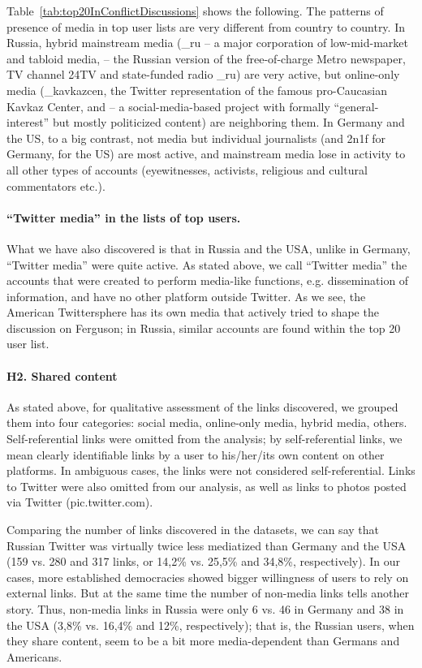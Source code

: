 Table~\cref{tab:top20InConflictDiscussions} shows the following. The patterns of presence of media in top user lists are very different from country to country. In Russia, hybrid mainstream media (\@lifenews\_ru -- a major corporation of low-mid-market and tabloid media, \@MetroRussia -- the Russian version of the free-of-charge Metro newspaper, TV channel \@Mir24TV and state-funded radio \@ruvr\_ru) are very active, but online-only media (\@news\_kavkazcen, the Twitter representation of the famous pro-Caucasian Kavkaz Center, and \@krgzr -- a social-media-based project with formally “general-interest” but mostly politicized content) are neighboring them. In Germany and the US, to a big contrast, not media but individual journalists (\@MattiasMeisner and \@2n1f for Germany, \@CaccioppoliMike for the US) are most active, and mainstream media lose in activity to all other types of accounts (eyewitnesses, activists, religious and cultural commentators etc.).

\paragraph{“Twitter media” in the lists of top users.} What we have also discovered is that in Russia and the USA, unlike in Germany, “Twitter media” were quite active. As stated above, we call “Twitter media” the accounts that were created to perform media-like functions, e.g. dissemination of information, and have no other platform outside Twitter. As we see, the American Twittersphere has its own media that actively tried to shape the discussion on Ferguson; in Russia, similar accounts are found within the top 20 user list.

\paragraph{H2. Shared content}
As stated above, for qualitative assessment of the links discovered, we grouped them into four categories: social media, online-only media, hybrid media, others. Self-referential links were omitted from the analysis; by self-referential links, we mean clearly identifiable links by a user to his/her/its own content on other platforms. In ambiguous cases, the links were not considered self-referential. Links to Twitter were also omitted from our analysis, as well as links to photos posted via Twitter (pic.twitter.com).

Comparing the number of links discovered in the datasets, we can say that Russian Twitter was virtually twice less mediatized than Germany and the USA (159 vs. 280 and 317 links, or 14,2\% vs. 25,5\% and 34,8\%, respectively). In our cases, more established democracies showed bigger willingness of users to rely on external links. But at the same time the number of non-media links tells another story. Thus, non-media links in Russia were only 6 vs. 46 in Germany and 38 in the USA (3,8\% vs. 16,4\% and 12\%, respectively); that is, the Russian users, when they share content, seem to be a bit more media-dependent than Germans and Americans.


